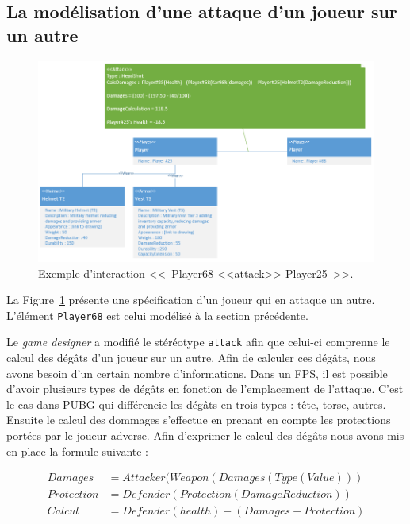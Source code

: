 \subsection{La modélisation d'une attaque d'un joueur sur un autre}
\begin{figure}
    \centering
    \includegraphics[width=14cm]{10_img/chap6/attack.PNG} 
    \caption{Exemple d'interaction <<~Player68 <<attack>> Player25~>>.}
    \label{fig.attack}
\end{figure}

La Figure~\ref{fig.attack} présente une sp\'ecification d'un joueur qui en attaque un autre.
L'élément \texttt{Player68} est celui modélisé \`a la section précédente.

Le \emph{game designer} a modifié le stéréotype \texttt{attack} afin que celui-ci comprenne le calcul des dégâts d'un joueur sur un autre.
Afin de calculer ces dégâts, nous avons besoin d'un certain nombre d'informations.
Dans un FPS, il est possible d'avoir plusieurs types de dégâts en fonction de l'emplacement de l'attaque.
C'est le cas dans PUBG qui différencie les dégâts en trois types : tête, torse, autres.
Ensuite le calcul des dommages s'effectue en prenant en compte les protections portées par le joueur adverse.
Afin d'exprimer le calcul des dégâts nous avons mis en place la formule suivante :

\begin{equation*}
\begin{split}
Damages& = Attacker(Weapon(Damages(Type(Value)))\\
Protection& = Defender(Protection(DamageReduction))\\
Calcul& = Defender(health) - (Damages - Protection)
\end{split}
\end{equation*}

